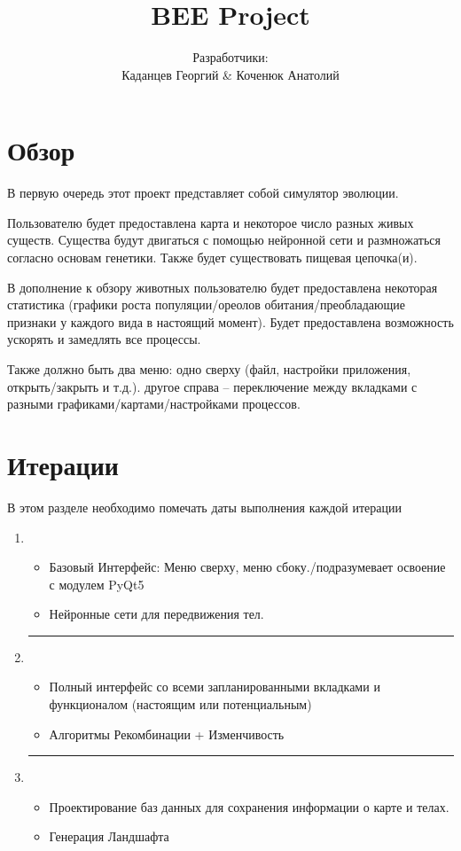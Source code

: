 \documentclass[12pt,a4paper, titlepage]{article}
\title{BEE Project}
\author{Разработчики: \\Каданцев Георгий \& Коченюк Анатолий}
\begin{document}
\maketitle
\section{Обзор}

В первую очередь этот проект представляет собой симулятор эволюции. 

Пользователю будет предоставлена карта и некоторое число разных живых существ. Существа будут двигаться с помощью нейронной сети и размножаться согласно основам генетики. Также будет существовать пищевая цепочка(и).

В дополнение к обзору животных пользователю будет предоставлена некоторая статистика (графики роста популяции/ореолов обитания/преобладающие признаки у каждого вида в настоящий момент). Будет предоставлена возможность ускорять и замедлять все процессы. 

Также должно быть два меню: одно сверху (файл, настройки приложения, открыть/закрыть и т.д.). другое справа -- переключение между вкладками с разными графиками/картами/настройками процессов. 
\section{Итерации}
В этом разделе необходимо помечать даты выполнения каждой итерации
\begin{enumerate}
	\item 
	\begin{itemize}
		\item Базовый Интерфейс: Меню сверху, меню сбоку./подразумевает освоение с модулем PyQt5
		\item Нейронные сети для передвижения тел. 
	\end{itemize}
	\hrule
	\item 
	\begin{itemize}
		\item Полный интерфейс со всеми запланированными вкладками и функционалом (настоящим или потенциальным)
		\item Алгоритмы Рекомбинации + Изменчивость
	\end{itemize}
	\hrule
	\item 
	\begin{itemize}
		\item Проектирование баз данных для сохранения информации о карте и телах.
		\item Генерация Ландшафта
	\end{itemize}
\end{enumerate}
\end{document}
